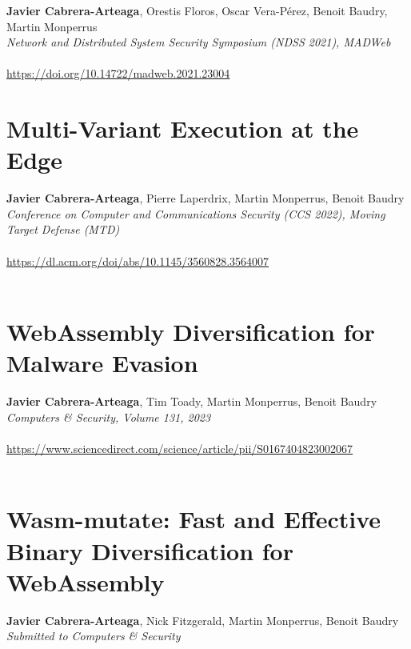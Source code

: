 \textbf{Javier Cabrera-Arteaga}, Orestis Floros, Oscar Vera-Pérez, Benoit Baudry, Martin Monperrus\\
\emph{Network and Distributed System Security Symposium (NDSS 2021), MADWeb}\\\\
\url{https://doi.org/10.14722/madweb.2021.23004}\\

%
    {} %
    {} %
    
\chapter{Multi-Variant Execution at the Edge}

\textbf{Javier Cabrera-Arteaga}, Pierre Laperdrix, Martin Monperrus, Benoit Baudry\\
\emph{Conference on Computer and Communications Security (CCS 2022), Moving Target Defense (MTD)}\\\\
 \url{https://dl.acm.org/doi/abs/10.1145/3560828.3564007}\\\\

%
    {} %
    {} %
    
\chapter{WebAssembly Diversification for Malware Evasion}

\textbf{Javier Cabrera-Arteaga}, Tim Toady, Martin Monperrus, Benoit Baudry\\
\emph{Computers \& Security, Volume 131, 2023}\\\\
\url{https://www.sciencedirect.com/science/article/pii/S0167404823002067}\\\\

%
    {} %
    {} %
    

\chapter{Wasm-mutate: Fast and Effective Binary Diversification for
WebAssembly}
\textbf{Javier Cabrera-Arteaga}, Nick Fitzgerald, Martin Monperrus, Benoit Baudry\\
\emph{Submitted to Computers \& Security}\\\\

